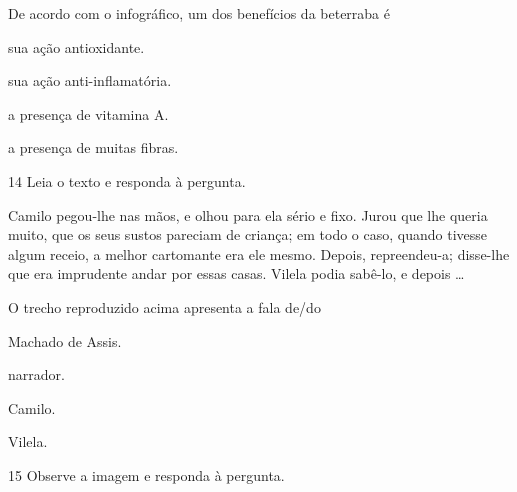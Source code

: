 \begin{myquote}
\begin{myescolha}
\begin{myquote}
\end{myquote}

De acordo com o infográfico, um dos benefícios da beterraba é

\begin{escolha}
  \item sua ação antioxidante.

  \item sua ação anti-inflamatória.

  \item a presença de vitamina A.

  \item a presença de muitas fibras.
\end{escolha}

\num{14} Leia o texto e responda à pergunta.

\begin{myquote}
Camilo pegou-lhe nas mãos, e olhou para ela sério e fixo. Jurou que lhe
queria muito, que os seus sustos pareciam de criança; em todo o caso,
quando tivesse algum receio, a melhor cartomante era ele mesmo. Depois,
repreendeu-a; disse-lhe que era imprudente andar por essas casas. Vilela
podia sabê-lo, e depois \ldots

\end{myquote}

O trecho reproduzido acima apresenta a fala de/do

\begin{escolha}
  \item Machado de Assis.

  \item narrador.

  \item Camilo.

  \item Vilela.
\end{escolha}

\num{15} Observe a imagem e responda à pergunta.

\begin{myquote}


\end{myquote}
\end{myescolha}
\end{myquote}

